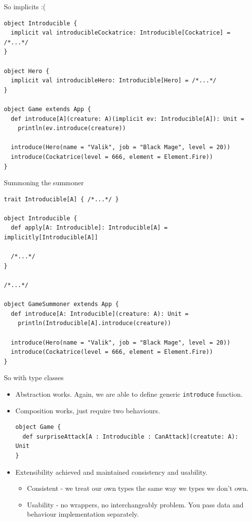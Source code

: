 \documentclass[presentation,aspectratio=169,smaller]{beamer}
\begin{document}
\begin{frame}[label={sec:org7435474},fragile]{So implicits :(}
 \begin{verbatim}
object Introducible {
  implicit val introducibleCockatrice: Introducible[Cockatrice] = /*...*/
}

object Hero {
  implicit val introducibleHero: Introducible[Hero] = /*...*/
}

object Game extends App {
  def introduce[A](creature: A)(implicit ev: Introducible[A]): Unit =
    println(ev.introduce(creature))

  introduce(Hero(name = "Valik", job = "Black Mage", level = 20))
  introduce(Cockatrice(level = 666, element = Element.Fire))
}
\end{verbatim}
\end{frame}

\begin{frame}[label={sec:orgecca0e8},fragile]{Summoning the summoner}
 \begin{verbatim}
trait Introducible[A] { /*...*/ }

object Introducible {
  def apply[A: Introducible]: Introducible[A] = implicitly[Introducible[A]]

  /*...*/
}

/*...*/

object GameSummoner extends App {
  def introduce[A: Introducible](creature: A): Unit =
    println(Introducible[A].introduce(creature))

  introduce(Hero(name = "Valik", job = "Black Mage", level = 20))
  introduce(Cockatrice(level = 666, element = Element.Fire))
}
\end{verbatim}
\end{frame}

\begin{frame}[label={sec:org8d7b14e},fragile]{So with type classes}
 \begin{itemize}
\item Abstraction works. Again, we are able to define generic \texttt{introduce} function.
\item Composition works, just require two behaviours.
\begin{verbatim}
object Game {
  def surpriseAttack[A : Introducible : CanAttack](creatute: A): Unit
}
\end{verbatim}
\item Extensibility achieved and maintained consistency and usability.
\begin{itemize}
\item Consistent - we treat our own types the same way we types we don't own.
\item Usability - no wrappers, no interchangeably problem. You pass data and
behaviour implementation separately.
\end{itemize}
\end{itemize}
\end{frame}
\end{document}
